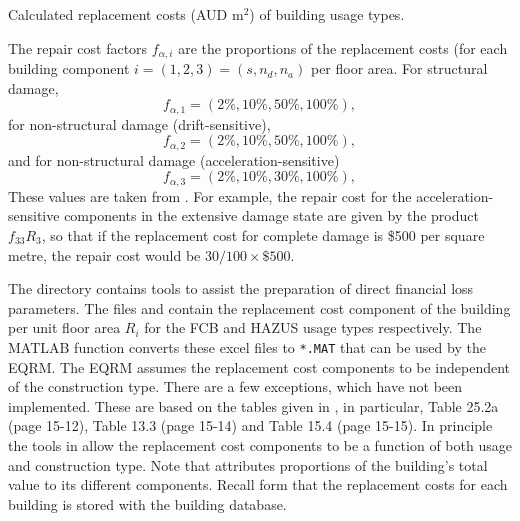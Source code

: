 \begin{table}[p]
\centering \caption{Calculated replacement costs (AUD
$\mathrm{m^2}$) of building
  usage types.}
  \vspace{0.8em}
\label{tab:replace_costs} \small

\end{table}


The repair cost factors $f_{\alpha, i}$
are the proportions of the replacement costs (for each building
component $i=(1,2,3)=(s, n_d, n_a)$  per floor area.
For structural damage,
\begin{equation}
 f_{\alpha, 1} = (2\%, 10\%, 50\%, 100\%),
\end{equation}
for non-structural damage (drift-sensitive),
\begin{equation}
 f_{\alpha, 2} = (2\%, 10\%, 50\%, 100\%),
\end{equation}
and for non-structural damage (acceleration-sensitive)
\begin{equation}
 f_{\alpha, 3} = (2\%, 10\%, 30\%, 100\%),
\end{equation}
These values are taken from \cite{dr_FEMA99b}. For example, the
repair cost for the acceleration-sensitive components in the
extensive damage state are given by the product $f_{33}R_3$, so
that if the replacement cost for complete damage is \$500 per
square metre, the repair cost would be $30/100\times\$500$.


The directory 
contains tools to assist the preparation of direct financial loss
parameters. The files
 and
 contain
the replacement cost component of the building per unit floor area
$R_i$ for the FCB and
HAZUS usage types respectively. The
MATLAB function 
converts these excel files to \texttt{*.MAT} that can be used by
the EQRM. The EQRM assumes the replacement cost components to be
independent of the construction type. There are a few exceptions,
which have not been implemented. These are based on the tables
given in \cite{dr_FEMA99b}, in particular, Table 25.2a (page
15-12), Table 13.3 (page 15-14) and Table 15.4 (page 15-15). In
principle the tools in
 allow the replacement
cost components to be a function of both usage and construction
type. Note that 
attributes proportions of the building's total value to its
different components. Recall form
 that the replacement costs for
each building is stored with the building database.

